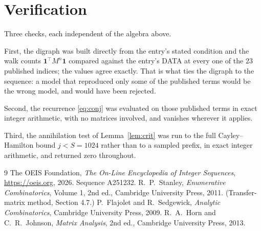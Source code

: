 \documentclass[11pt,a4paper]{article}
\theoremstyle{plain}
\theoremstyle{definition}
\begin{document}
\section{Verification}

Three checks, each independent of the algebra above.

First, the digraph was built directly from the entry's stated condition and the walk counts
$\mathbf{1}^{\!\top}M^{n}\mathbf{1}$ compared against the entry's DATA at every one of
the $23$ published indices; the values agree exactly. That is what ties the digraph to
the sequence: a model that reproduced only some of the published terms would be the wrong
model, and would have been rejected.

Second, the recurrence \eqref{eq:conj} was evaluated on those published terms in exact
integer arithmetic, with no matrices involved, and vanishes wherever it applies.

Third, the annihilation test of Lemma~\ref{lem:crit} was run to the full Cayley--Hamilton
bound $j<S=1024$ rather than to a sampled prefix, in exact integer arithmetic, and returned
zero throughout.

\begin{thebibliography}{9}
 The OEIS Foundation, \emph{The On-Line Encyclopedia of Integer
Sequences}, \url{https://oeis.org}, 2026. Sequence A251232.
 R.~P.~Stanley, \emph{Enumerative Combinatorics}, Volume 1, 2nd ed.,
Cambridge University Press, 2011. (Transfer-matrix method, Section 4.7.)
 P.~Flajolet and R.~Sedgewick, \emph{Analytic Combinatorics}, Cambridge
University Press, 2009.
 R.~A.~Horn and C.~R.~Johnson, \emph{Matrix Analysis}, 2nd ed., Cambridge
University Press, 2013.
\end{thebibliography}
\end{document}
